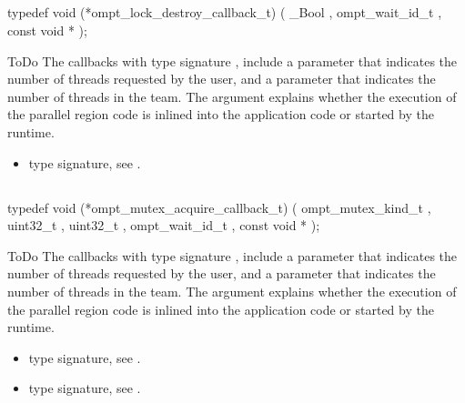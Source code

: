 \subsection{}
\label{subsec:ompt_lock_destroy_callback_t}
\format
\begin{boxedcode}
typedef void (*ompt\_lock\_destroy\_callback\_t) (
  \_Bool ,
  ompt\_wait\_id\_t ,
  const void *
);
\end{boxedcode}
\descr ToDo
The callbacks with type signature ,
include a parameter 
that indicates the number of threads requested by the user, and a parameter
 that indicates the number of threads in the team.
The  argument explains whether the execution of the parallel
region code is inlined into the application code or started by the runtime.

\crossreferences
\begin{itemize}
\item {} type signature, see
.
\end{itemize}



\subsection{}
\label{subsec:ompt_mutex_acquire_callback_t}
\format
\begin{boxedcode}
typedef void (*ompt\_mutex\_acquire\_callback\_t) (
  ompt\_mutex\_kind\_t ,
  uint32\_t ,
  uint32\_t ,
  ompt\_wait\_id\_t ,
  const void *
);
\end{boxedcode}
\descr ToDo
The callbacks with type signature ,
include a parameter 
that indicates the number of threads requested by the user, and a parameter
 that indicates the number of threads in the team.
The  argument explains whether the execution of the parallel
region code is inlined into the application code or started by the runtime.

\crossreferences
\begin{itemize}
\item {} type signature, see
.
\item {} type signature, see
.
\end{itemize}



